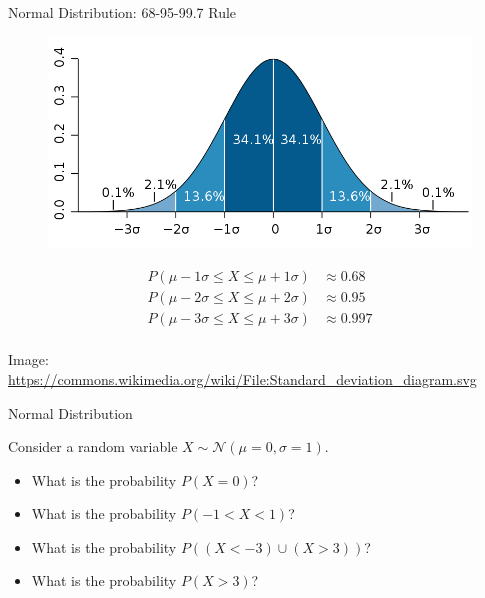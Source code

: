 \begin{frame}{Normal Distribution: 68-95-99.7 Rule}

    \begin{figure}
        \includegraphics[width=0.7\linewidth]{gfx/web/standard-deviation-diagram}
    \end{figure}
    \begin{align*}
    P(\mu - 1\sigma \leq X \leq \mu + 1\sigma) &\approx 0.68 \\
    P(\mu - 2\sigma \leq X \leq \mu + 2\sigma) &\approx 0.95 \\
    P(\mu - 3\sigma \leq X \leq \mu + 3\sigma) &\approx 0.997 \\
    \end{align*}
    
    {\tiny Image: \url{https://commons.wikimedia.org/wiki/File:Standard_deviation_diagram.svg}}

\end{frame}

\begin{frame}{Normal Distribution}
    \begin{example}
        \medskip
        Consider a random variable $X \sim \mathcal{N}(\mu=0, \sigma=1)$.
        \begin{itemize}
            \item What is the probability $P(X=0)$?
            \item What is the probability $P(-1 < X < 1)$?
            \item What is the probability $P((X < -3) \cup (X > 3))$?
            \item What is the probability $P(X > 3)$?
        \end{itemize}
    \end{example}
\end{frame}

